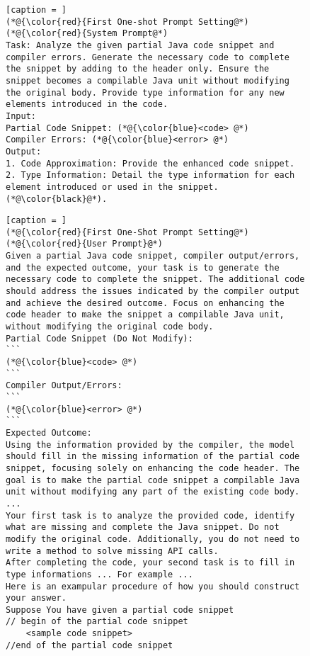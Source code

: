 \begin{figure}[t]
	\centering
\begin{minipage}{.5\textwidth}        
\begin{lstlisting}[caption = ]
(*@{\color{red}{First One-shot Prompt Setting@*)
(*@{\color{red}{System Prompt@*)
Task: Analyze the given partial Java code snippet and compiler errors. Generate the necessary code to complete the snippet by adding to the header only. Ensure the snippet becomes a compilable Java unit without modifying the original body. Provide type information for any new elements introduced in the code.
Input:
Partial Code Snippet: (*@{\color{blue}<code> @*)
Compiler Errors: (*@{\color{blue}<error> @*)
Output:
1. Code Approximation: Provide the enhanced code snippet.
2. Type Information: Detail the type information for each element introduced or used in the snippet.(*@\color{black}@*). 
\end{lstlisting}
\end{minipage}
\begin{minipage}{.5\textwidth}        
\begin{lstlisting}[caption = ]
(*@{\color{red}{First One-Shot Prompt Setting@*)
(*@{\color{red}{User Prompt}@*)
Given a partial Java code snippet, compiler output/errors, and the expected outcome, your task is to generate the necessary code to complete the snippet. The additional code should address the issues indicated by the compiler output and achieve the desired outcome. Focus on enhancing the code header to make the snippet a compilable Java unit, without modifying the original code body.
Partial Code Snippet (Do Not Modify):
```
(*@{\color{blue}<code> @*)
```
Compiler Output/Errors:
```
(*@{\color{blue}<error> @*)
```
Expected Outcome:
Using the information provided by the compiler, the model should fill in the missing information of the partial code snippet, focusing solely on enhancing the code header. The goal is to make the partial code snippet a compilable Java unit without modifying any part of the existing code body. ...
Your first task is to analyze the provided code, identify what are missing and complete the Java snippet. Do not modify the original code. Additionally, you do not need to write a method to solve missing API calls.
After completing the code, your second task is to fill in type informations ... For example ...
Here is an exampular procedure of how you should construct your answer.
Suppose You have given a partial code snippet
// begin of the partial code snippet
    <sample code snippet>
//end of the partial code snippet


\end{lstlisting}
\end{minipage}
\end{figure}
